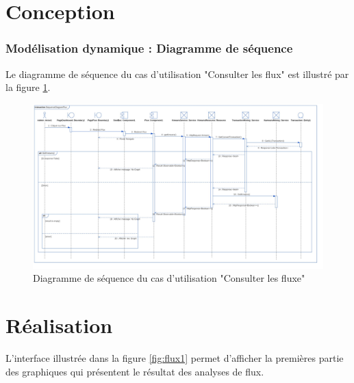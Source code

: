 \section{Conception}
\subsubsection{Modélisation dynamique : Diagramme de s\'equence}
Le diagramme de s\'equence du cas d'utilisation "Consulter les flux" est illustré par la figure \ref{fig:SequenceDiagramFlux}.
\newpage
\begin{figure}[!htbp]\centering
\includegraphics[width=1.4\columnwidth,angle=90]{chapitres/chapitre7/figures/SequenceDiagramFlux.jpg}
\caption{Diagramme de séquence du cas d'utilisation "Consulter les fluxe"}
\label{fig:SequenceDiagramFlux}
\end{figure}
\section{Réalisation}
L'interface illustrée dans la figure \ref{fig:flux1} permet d'afficher la premières partie
 des graphiques qui présentent le résultat des analyses de flux. 

